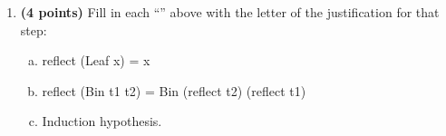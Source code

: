 \documentclass[12pt]{article}
\begin{document}
\begin{enumerate}
{\begin{verbatim}
applyEnv rho x = case (lookup x rho) of
                   Just (MystVal e) -> eval e rho
                   Just v             -> v
                   Nothing            -> error ("Var "++x++" unbound\n")
\end{verbatim}
}

\newpage


{\bf Directions.} 
The following are definitions for binary trees and a function, \<reflect\>.
\begin{haskell}
 Tree a &=&\relax Leaf a | Bin (Tree a) (Tree a)
\\
reflect (Leaf x) &=&\relax Leaf x
\\
reflect (Bin t1 t2) &=&\relax Bin (reflect t2) (reflect t1)
\end{haskell}
The following is a proof by induction of: forall \<t :: Tree a\>, \<reflect (reflect t) = t\>.
Notice that, off to the right side of each proof line, is a ``\<[\underline{~~~~}]\>''.

\begin{haskell}
\\
\\
&=&\relax reflect (Leaf x) ~~~~~~~~~~~~~~~& [\underline{~~~~}]
\\
&=&\relax Leaf x ~~~~~~~~~~~~~~~& [\underline{~~~~}]
\\
\vspace{1in}\\
\\
\\
&=&\relax reflect (Bin (reflect t2) (reflect t1)) ~~~~~~~~~~~~~~~& [\underline{~~~~}]
\\
&=&\relax Bin (reflect (reflect t1)) (reflect (reflect t2)) ~~~~~& [\underline{~~~~}]
\\
&=&\relax Bin t1 (reflect (reflect t2)) ~~~~~~~~~~~~~~~& [\underline{~~~~}]
\\
&=&\relax Bin t1 t2 ~~~~~~~~~~~~~~~& [\underline{~~~~}]
\\
\end{haskell}

\item {\bf (4 points)} Fill in each ``\<[\underline{~~~~}]\>'' above with the letter of the justification for that step:
\begin{enumerate}[a.]
\item \<reflect (Leaf x) = x\>
\item \<reflect (Bin t1 t2) = Bin (reflect t2) (reflect t1)\>
\item Induction hypothesis.
\end{enumerate}
\end{enumerate}
\end{document}

